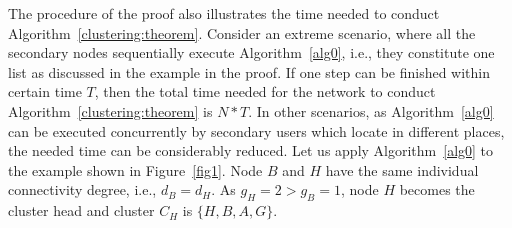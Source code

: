 \documentclass[10pt,journal,compsoc]{IEEEtran}
\theoremstyle{mytheoremstyle}
\theoremstyle{mytheoremstyle}
\theoremstyle{mytheoremstyle}
\newcommand{\ie}{i.e., }
\begin{document}
The procedure of the proof also illustrates the time needed to conduct Algorithm~\ref{clustering:theorem}. 
Consider an extreme scenario, where all the secondary nodes sequentially execute Algorithm~\ref{alg0}, \ie they constitute one list as discussed in the example in the proof.
%
If one step can be finished within certain time $T$, then the total time needed for the network to conduct Algorithm~\ref{clustering:theorem} is $N*T$.
In other scenarios, as Algorithm~\ref{alg0} can be executed concurrently by secondary users which locate in different places, the needed time can be considerably reduced.
%
Let us apply Algorithm~\ref{alg0} to the example shown in Figure~\ref{fig1}.
Node $B$ and $H$ have the same individual connectivity degree, i.e., $d_B=d_H$. As $g_H=2>g_B=1$, node $H$ becomes the cluster head and cluster $C_H$ is $\{H, B, A, G\}$.
	
\end{document}
